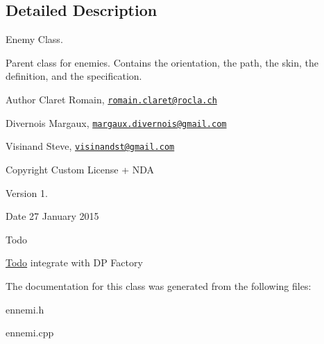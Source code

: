 \subsection{Detailed Description}
Enemy Class. 

Parent class for enemies. Contains the orientation, the path, the skin, the definition, and the specification. \begin{DoxyAuthor}{Author}
Claret Romain, \href{mailto:romain.claret@rocla.ch}{\tt romain.\+claret@rocla.\+ch} 

Divernois Margaux, \href{mailto:margaux.divernois@gmail.com}{\tt margaux.\+divernois@gmail.\+com} 

Visinand Steve, \href{mailto:visinandst@gmail.com}{\tt visinandst@gmail.\+com} 
\end{DoxyAuthor}
\begin{DoxyCopyright}{Copyright}
Custom License + N\+D\+A 
\end{DoxyCopyright}
\begin{DoxyVersion}{Version}
1. 
\end{DoxyVersion}
\begin{DoxyDate}{Date}
27 January 2015 
\end{DoxyDate}
\begin{DoxyRefDesc}{Todo}
\item[\hyperlink{todo__todo000004}{Todo}]integrate with D\+P Factory \end{DoxyRefDesc}


The documentation for this class was generated from the following files\+:\begin{DoxyCompactItemize}
\item 
ennemi.\+h\item 
ennemi.\+cpp\end{DoxyCompactItemize}
